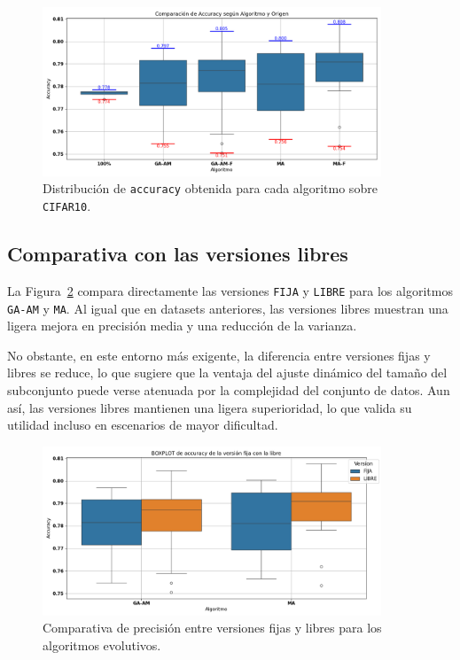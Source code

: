 \begin{figure}[htp]
    \centering
    \includegraphics[width=0.9\textwidth]{imagenes/evaluaciones/cifar10/boxplot-por-algoritmo.png}
    \caption{Distribución de \texttt{accuracy} obtenida para cada algoritmo sobre \texttt{CIFAR10}.}
    \label{fig:cifar10_boxplot}
\end{figure}

\subsection{Comparativa con las versiones libres}
La Figura~\ref{fig:cifar10_fija_vs_libre} compara directamente las versiones \texttt{FIJA} y \texttt{LIBRE} para los algoritmos \texttt{GA-AM} y \texttt{MA}.
Al igual que en datasets anteriores, las versiones libres muestran una ligera mejora en precisión media y una reducción de la varianza.

No obstante, en este entorno más exigente, la diferencia entre versiones fijas y libres se reduce,
lo que sugiere que la ventaja del ajuste dinámico del tamaño del subconjunto puede verse atenuada por la complejidad del conjunto de datos.
Aun así, las versiones libres mantienen una ligera superioridad, lo que valida su utilidad incluso en escenarios de mayor dificultad.

\begin{figure}[htp]
    \centering
    \includegraphics[width=0.9\textwidth]{imagenes/evaluaciones/cifar10/boxplot-libres.png}
    \caption{Comparativa de precisión entre versiones fijas y libres para los algoritmos evolutivos.}
    \label{fig:cifar10_fija_vs_libre}
\end{figure}

